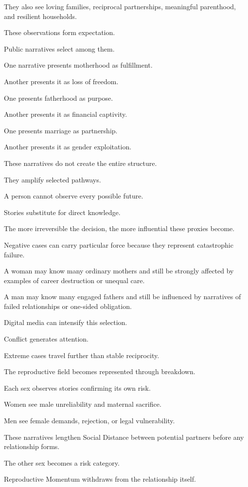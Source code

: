 They also see loving families, reciprocal partnerships, meaningful parenthood, and resilient households.

These observations form expectation.

Public narratives select among them.

One narrative presents motherhood as fulfillment.

Another presents it as loss of freedom.

One presents fatherhood as purpose.

Another presents it as financial captivity.

One presents marriage as partnership.

Another presents it as gender exploitation.

These narratives do not create the entire structure.

They amplify selected pathways.

A person cannot observe every possible future.

Stories substitute for direct knowledge.

The more irreversible the decision, the more influential these proxies become.

Negative cases can carry particular force because they represent catastrophic failure.

A woman may know many ordinary mothers and still be strongly affected by examples of career destruction or unequal care.

A man may know many engaged fathers and still be influenced by narratives of failed relationships or one-sided obligation.

Digital media can intensify this selection.

Conflict generates attention.

Extreme cases travel further than stable reciprocity.

The reproductive field becomes represented through breakdown.

Each sex observes stories confirming its own risk.

Women see male unreliability and maternal sacrifice.

Men see female demands, rejection, or legal vulnerability.

These narratives lengthen Social Distance between potential partners before any relationship forms.

The other sex becomes a risk category.

Reproductive Momentum withdraws from the relationship itself.

